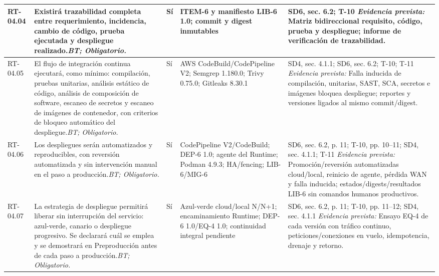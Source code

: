 \begin{paginaHorizontalSynaptix}
\begin{longtable}{|L{0.09\AnchoMatrizTDoce}|L{0.385\AnchoMatrizTDoce}|L{0.065\AnchoMatrizTDoce}|L{0.18\AnchoMatrizTDoce}|L{0.28\AnchoMatrizTDoce}|}
RT-\allowbreak{}04.\allowbreak{}04 &
Existirá trazabilidad completa entre requerimiento, incidencia, cambio de código, prueba ejecutada y despliegue realizado.\newline\textit{BT; Obligatorio.} &
Sí &
ITEM-6 y manifiesto LIB-6 1.0; commit y digest inmutables &
SD6, sec. 6.2; T-10 \newline\textit{Evidencia prevista:} Matriz bidireccional requisito, código, prueba y despliegue; informe de verificación de trazabilidad. \\ \hline

RT-\allowbreak{}04.\allowbreak{}05 &
El flujo de integración continua ejecutará, como mínimo: compilación, pruebas unitarias, análisis estático de código, análisis de composición de software, escaneo de secretos y escaneo de imágenes de contenedor, con criterios de bloqueo automático del despliegue.\newline\textit{BT; Obligatorio.} &
Sí &
AWS CodeBuild/CodePipeline V2; Semgrep 1.180.0; Trivy 0.75.0; Gitleaks 8.30.1 &
SD4, sec. 4.1.1; SD6, sec. 6.2; T-10; T-11 \newline\textit{Evidencia prevista:} Falla inducida de compilación, unitarias, SAST, SCA, secretos e imágenes bloquea despliegue; reportes y versiones ligados al mismo commit/digest. \\ \hline

RT-\allowbreak{}04.\allowbreak{}06 &
Los despliegues serán automatizados y reproducibles, con reversión automatizada y sin intervención manual en el paso a producción.\newline\textit{BT; Obligatorio.} &
Sí &
CodePipeline V2/CodeBuild; DEP-6 1.0; agente del Runtime; Podman 4.9.3; HA/fencing; LIB-6/MIG-6 &
SD6, sec. 6.2, p. 11; T-10, pp. 10--11; SD4, sec. 4.1.1; T-11 \newline\textit{Evidencia prevista:} Promoción/reversión automatizadas cloud/local, reinicio de agente, pérdida WAN y falla inducida; estados/digests/resultados LIB-6 sin comandos humanos productivos. \\ \hline

RT-\allowbreak{}04.\allowbreak{}07 &
La estrategia de despliegue permitirá liberar sin interrupción del servicio: azul-verde, canario o despliegue progresivo. Se declarará cuál se emplea y se demostrará en Preproducción antes de cada paso a producción.\newline\textit{BT; Obligatorio.} &
Sí &
Azul-verde cloud/local N/N+1; encaminamiento Runtime; DEP-6 1.0/EQ-4 1.0; continuidad integral pendiente &
SD6, sec. 6.2, p. 11; T-10, pp. 11--12; SD4, sec. 4.1.1 \newline\textit{Evidencia prevista:} Ensayo EQ-4 de cada versión con tráfico continuo, peticiones/conexiones en vuelo, idempotencia, drenaje y retorno. \\ \hline


\end{longtable}
\end{paginaHorizontalSynaptix}
